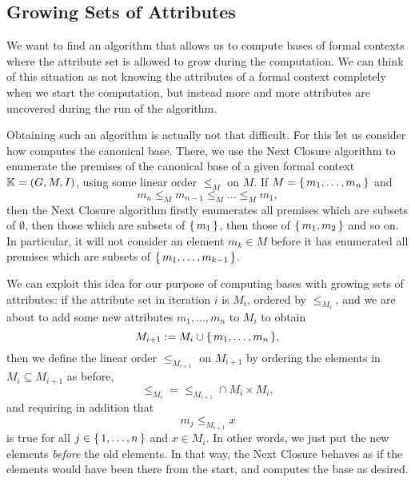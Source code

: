 \subsection{Growing Sets of Attributes}
\label{sec:grow-sets-attr}

We want to find an algorithm that allows us to compute bases of formal contexts where the
attribute set is allowed to grow during the computation.  We can think of this situation
as not knowing the attributes of a formal context completely when we start the
computation, but instead more and more attributes are uncovered during the run of the
algorithm.

Obtaining such an algorithm is actually not that difficult.  For this let us consider how
 computes the canonical base.  There, we use the Next Closure
algorithm to enumerate the premises of the canonical base of a given formal context ${\mathbb{K}} = (G, M, I)$, using some linear order $\leq_{M}$ on $M$.  If $M = {\{\, m_{1}, \dots,
  m_{n} \,\}}$ and
\begin{equation*}
  m_{n} \leq_{M} m_{n-1} \leq_{M} \dots \leq_{M} m_{1},
\end{equation*}
then the Next Closure algorithm firstly enumerates all premises which are subsets of
$\emptyset$, then those which are subsets of ${\{\, m_{1} \,\}}$, then those of ${\{\, m_{1},
  m_{2} \,\}}$ and so on.  In particular, it will not consider an element $m_{k} \in M$ before
it has enumerated all premises which are subsets of ${\{\, m_{1}, \dots, m_{k-1} \,\}}$.

We can exploit this idea for our purpose of computing bases with growing sets of
attributes: if the attribute set in iteration $i$ is $M_{i}$, ordered by $\leq_{M_{i}}$,
and we are about to add some new attributes $m_{1}, \dots, m_{n}$ to $M_{i}$ to obtain
\begin{equation*}
  M_{i+1} := M_{i} \cup {\ensuremath{\{\, m_{1}, \dots, m_{n} \,\}}},
\end{equation*}
then we define the linear order $\leq_{M_{i+1}}$ on $M_{i+1}$ by ordering the elements in
$M_{i} \subseteq M_{i+1}$ as before, \ie
\begin{equation}
  \label{eq:48}
  \leq_{M_{i}} = {\leq_{M_{i+1}}} \cap M_{i} \times M_{i},
\end{equation}
and requiring in addition that
\begin{equation}
  \label{eq:49}
  m_{j} \leq_{M_{i+1}} x
\end{equation}
is true for all $j \in {\ensuremath{\{\, 1, \dots, n \,\}}}$ and $x \in M_{i}$.  In other words, we just
put the new elements \emph{before} the old elements.  In that way, the Next Closure
behaves as if the elements would have been there from the start, and computes the base as
desired.

